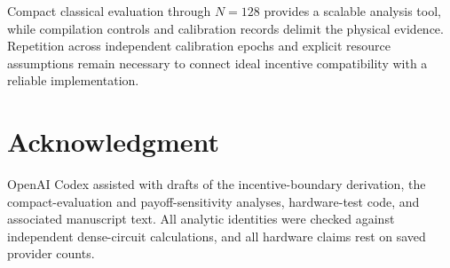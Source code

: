 \documentclass[conference,letterpaper,10pt]{IEEEtran}
\begin{document}
Compact classical evaluation through $N=128$ provides a scalable analysis
tool, while compilation controls and calibration records delimit the
physical evidence. Repetition across independent calibration epochs and
explicit resource assumptions remain necessary to connect ideal incentive
compatibility with a reliable implementation.

\section*{Acknowledgment}
OpenAI Codex assisted with drafts of the incentive-boundary derivation, the
compact-evaluation and payoff-sensitivity analyses, hardware-test code, and
associated manuscript text. All analytic identities were checked against
independent dense-circuit calculations, and all hardware claims rest on saved
provider counts.



\end{document}
